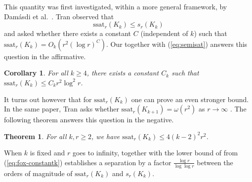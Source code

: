 \documentclass[12pt]{article}
\newcommand{\cG}{{\cal G}}
\newtheorem{theorem}{Theorem}
\newtheorem{corollary}{Corollary}
\theoremstyle{definition}
\begin{document}
	This quantity was first investigated, within a more general framework, by Dam\'asdi et al.\ \cite{damasdi2021saturation}. Tran \cite{tran2022two} observed that 
	\begin{equation} \label{eq:semisat}
		\mathrm{ssat}_r(K_k) \leq s_r(K_k)
	\end{equation}
	and asked \cite[Question 4.2]{tran2022two} whether there exists a constant $C$ (independent of $k$) such that $\mathrm{ssat}_r(K_{k}) = O_k(r^2(\log r)^C)$.
	Our  together with (\ref{eq:semisat}) answers this question in the affirmative. 
	\begin{corollary}
		For all $k \geq 4$, there exists a constant $C_k$ such that  $\mathrm{ssat}_r(K_k) \leq C_kr^2 \log^2 r$.
	\end{corollary}
	
	It turns out however that for $\mathrm{ssat}_r(K_k)$ one can prove an even stronger bound. 
	In the same paper, Tran asks whether $\mathrm{ssat}_r(K_{k+1}) = \omega(r^2)$ as $r \to \infty$ \cite[Question 4.1]{tran2022two}. The following theorem answers this question in the negative.
	\begin{theorem}\label{thm:semisaturation}
		For all $k,r \geq 2$, we have $\mathrm{ssat}_r(K_{k}) \leq 4(k-2)^2r^2$.
	\end{theorem}
	When $k$ is fixed and $r$ goes to infinity,  together with the lower bound of \cite{fox2016minimum} from (\ref{eq:fox-constantk}) establishes a separation by a factor $\frac{\log r}{\log\log r}$ between the orders of magnitude of $\mathrm{ssat}_r(K_{k})$ and $s_r(K_k)$.
	
\end{document}
